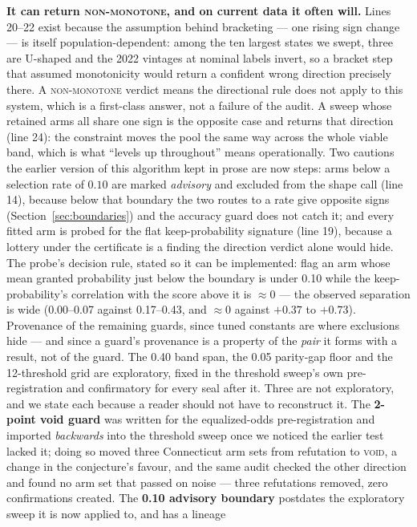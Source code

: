 \documentclass[9pt,conference]{IEEEtran}
\begin{document}
\textbf{It can return \textsc{non-monotone}, and on current data it often will.} Lines
20--22 exist because the assumption behind bracketing --- one rising sign change --- is
itself population-dependent: among the ten largest states we swept, three are U-shaped
and the 2022 vintages at nominal labels invert, so a bracket step that assumed
monotonicity would return a confident wrong direction precisely there. A
\textsc{non-monotone} verdict means the directional rule does not apply to this system,
which is a first-class answer, not a failure of the audit. A sweep whose retained arms
all share one sign is the opposite case and returns that direction (line 24): the
constraint moves the pool the same way across the whole viable band, which is what
``levels up throughout'' means operationally. Two cautions the earlier version of this
algorithm kept in prose are now steps: arms below a selection rate of $0.10$ are marked
\emph{advisory} and excluded from the shape call (line 14), because below that boundary
the two routes to a rate give opposite signs (Section~\ref{sec:boundaries}) and the
accuracy guard does not catch it; and every fitted arm is probed for the flat
keep-probability signature (line 19), because a lottery under the certificate is a
finding the direction verdict alone would hide. The probe's decision rule, stated so it
can be implemented: flag an arm whose mean granted probability just below the boundary
is under 0.10 while the keep-probability's correlation with the score above it is
$\approx 0$ --- the observed separation is wide (0.00--0.07 against 0.17--0.43, and
$\approx 0$ against $+0.37$ to $+0.73$). Provenance of the remaining guards, since tuned
constants are where exclusions hide --- and since a guard's provenance is a property of
the \emph{pair} it forms with a result, not of the guard. The 0.40 band span, the 0.05
parity-gap floor and the 12-threshold grid are exploratory, fixed in the threshold sweep's
own pre-registration and confirmatory for every seal after it. Three are not exploratory,
and we state each because a reader should not have to reconstruct it. The \textbf{2-point
void guard} was written for the equalized-odds pre-registration and imported
\emph{backwards} into the threshold sweep once we noticed the earlier test lacked it; doing
so moved three Connecticut arm sets from refutation to \textsc{void}, a change in the
conjecture's favour, and the same audit checked the other direction and found no arm set
that passed on noise --- three refutations removed, zero confirmations created. The \textbf{0.10
advisory boundary} postdates the exploratory sweep it is now applied to, and has a lineage
\end{document}
